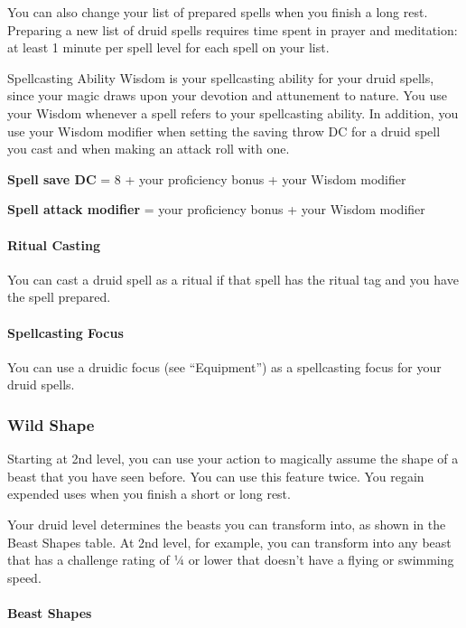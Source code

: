 \documentclass[
]{article}
\begin{document}
You can also change your list of prepared spells when you finish a long
rest. Preparing a new list of druid spells requires time spent in prayer
and meditation: at least 1 minute per spell level for each spell on your
list.

Spellcasting Ability Wisdom is your spellcasting ability for your druid
spells, since your magic draws upon your devotion and attunement to
nature. You use your Wisdom whenever a spell refers to your spellcasting
ability. In addition, you use your Wisdom modifier when setting the
saving throw DC for a druid spell you cast and when making an attack
roll with one.

\textbf{Spell save DC} = 8 + your proficiency bonus + your Wisdom
modifier

\textbf{Spell attack modifier} = your proficiency bonus + your Wisdom
modifier

\hypertarget{ritual-casting}{%
\paragraph{Ritual Casting}\label{ritual-casting}}

You can cast a druid spell as a ritual if that spell has the ritual tag
and you have the spell prepared.

\hypertarget{spellcasting-focus}{%
\paragraph{Spellcasting Focus}\label{spellcasting-focus}}

You can use a druidic focus (see ``Equipment'') as a spellcasting focus
for your druid spells.

\hypertarget{wild-shape}{%
\subsubsection{Wild Shape}\label{wild-shape}}

Starting at 2nd level, you can use your action to magically assume the
shape of a beast that you have seen before. You can use this feature
twice. You regain expended uses when you finish a short or long rest.

Your druid level determines the beasts you can transform into, as shown
in the Beast Shapes table. At 2nd level, for example, you can transform
into any beast that has a challenge rating of ¼ or lower that doesn't
have a flying or swimming speed.

\hypertarget{beast-shapes}{%
\paragraph{Beast Shapes}\label{beast-shapes}}
\end{document}
